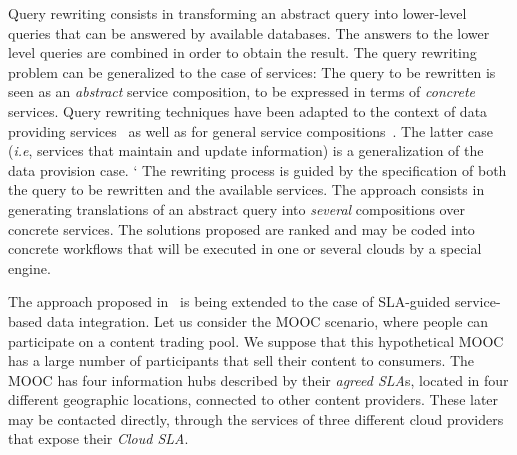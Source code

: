 

Query rewriting 
 consists in transforming an abstract query into lower-level queries that can be answered by available databases.
The answers to the lower level queries are combined in order to obtain the result.
The query rewriting problem can be generalized to the case of services:
The query to be rewritten is seen as an \textit{abstract} service composition, to be expressed in terms of \textit{concrete} services.
Query rewriting techniques have been adapted to the context of data providing services~\cite{BBM10,ZLC11} as well as for general service compositions~\cite{CostaAMR13}. 
The latter case (\textit{i.e}, services that maintain and update information) is a generalization of the data provision case.
`%
The rewriting process is guided by the specification of both the query to be rewritten and the available services.
The approach consists in generating translations of an abstract query into \textit{several}  compositions over concrete  services. 
The solutions proposed are ranked and may be coded into concrete workflows that will be executed in one or several clouds by a special engine.

The approach proposed in~\cite{CostaAMR13} is being extended to the case of SLA-guided service-based data integration. 
%
Let us consider the MOOC scenario, where people can participate on a content trading pool.
We suppose that this hypothetical MOOC has a large number of participants that sell their content  to  consumers. 
The MOOC has four information hubs described by their {\em agreed SLA}s, located in four different geographic locations, connected to other content providers.
These later may be  contacted directly, through the services of three different cloud providers that expose their {\em Cloud SLA}.

